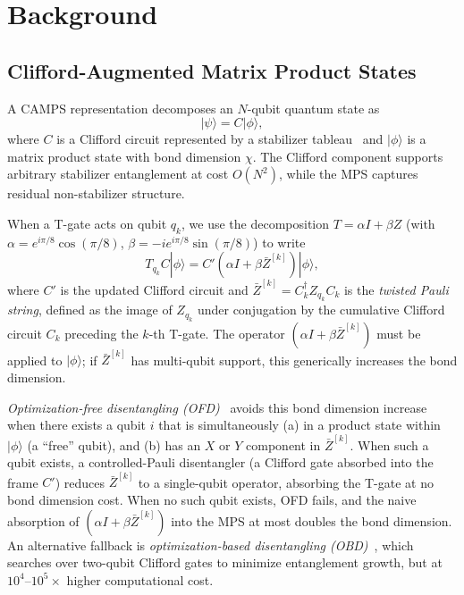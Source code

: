 \documentclass[a4paper,twocolumn,11pt]{quantumarticle}
\begin{document}
\section{Background}
\label{sec:background}

\subsection{Clifford-Augmented Matrix Product States}

A CAMPS representation decomposes an $N$-qubit quantum state as
\begin{equation}
\label{eq:camps}
|\psi\rangle = C|\phi\rangle,
\end{equation}
where $C$ is a Clifford circuit represented by a stabilizer tableau~\cite{Aaronson2004} and $|\phi\rangle$ is a matrix product state with bond dimension $\chi$.
The Clifford component supports arbitrary stabilizer entanglement at cost $O(N^2)$, while the MPS captures residual non-stabilizer structure.

When a T-gate acts on qubit $q_k$, we use the decomposition $T = \alpha I + \beta Z$ (with $\alpha = e^{i\pi/8}\cos(\pi/8)$, $\beta = -ie^{i\pi/8}\sin(\pi/8)$) to write
\begin{equation}
\label{eq:tgate_absorption}
T_{q_k} C|\phi\rangle = C'(\alpha I + \beta \bar{Z}^{[k]})|\phi\rangle,
\end{equation}
where $C'$ is the updated Clifford circuit and $\bar{Z}^{[k]} = C_k^\dagger Z_{q_k} C_k$ is the \emph{twisted Pauli string}, defined as the image of $Z_{q_k}$ under conjugation by the cumulative Clifford circuit $C_k$ preceding the $k$-th T-gate.
The operator $(\alpha I + \beta \bar{Z}^{[k]})$ must be applied to $|\phi\rangle$; if $\bar{Z}^{[k]}$ has multi-qubit support, this generically increases the bond dimension.

\emph{Optimization-free disentangling (OFD)}~\cite{Liu2024} avoids this bond dimension increase when there exists a qubit $i$ that is simultaneously (a) in a product state within $|\phi\rangle$ (a ``free'' qubit), and (b) has an $X$ or $Y$ component in $\bar{Z}^{[k]}$.
When such a qubit exists, a controlled-Pauli disentangler (a Clifford gate absorbed into the frame $C'$) reduces $\bar{Z}^{[k]}$ to a single-qubit operator, absorbing the T-gate at no bond dimension cost.
When no such qubit exists, OFD fails, and the naive absorption of $(\alpha I + \beta \bar{Z}^{[k]})$ into the MPS at most doubles the bond dimension.
An alternative fallback is \emph{optimization-based disentangling (OBD)}~\cite{Qian2024}, which searches over two-qubit Clifford gates to minimize entanglement growth, but at $10^4$--$10^5\times$ higher computational cost.
\end{document}
